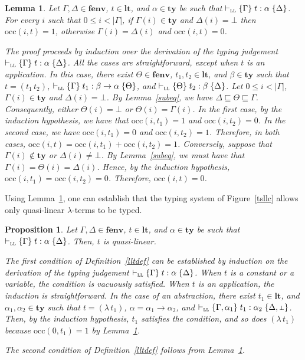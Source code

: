 \documentclass[submission,creativecommons]{eptcs}
\newtheorem{lemma}{Lemma}
\newtheorem{proposition}{Proposition}
\newcommand{\mybox}{\raisebox{3.5pt}{\framebox[7pt]{\rule{0mm}{0.3pt}}}}
\def\qed{\ifmmode\mybox\else{\unskip\nobreak\hfil
\penalty50\hskip1em\null\nobreak\hfil\mybox
\parfillskip=0pt\finalhyphendemerits=0\endgraf}\fi}
\newenvironment{proof}{%

\vspace{.7ex}
\noindent{\it Proof.} \rm}{\qed}
\newcommand{\bt}{{\scriptstyle\bot}}
\newcommand{\iabs}[1]{(\lambda\,#1)}
\newcommand{\iapp}[2]{(#1\,#2)}
\newcommand{\tytm}[4]{\{#1\}\;#2:#3\;\{#4\}}
\newcommand{\der}[1]{\vdash_{#1}}
\newcommand{\Sll}{{\textsc{ll}}}
\newcommand{\ltm}{\mathord{\mathbf{lt}}}
\newcommand{\ty}{\mathord{\mathbf{ty}}}
\newcommand{\fenv}{\mathord{\mathbf{fenv}}}
\newcommand{\occ}[2]{\mathord{\mathrm{occ}}(#1,#2)}
\begin{document}
\begin{lemma}\label{quasi-linearity-aux}
Let $\Gamma, \Delta\in\fenv$, $t\in\ltm$, and $\alpha\in\ty$ be such that
$\der{\Sll}\tytm{\Gamma}{t}{\alpha}{\Delta}$.
For every $i$ such that $0\leq i <|\Gamma|$, if $\Gamma(i)\in\ty$ and $\Delta(i)=\bt$
then $\occ{i}{t} = 1$, otherwise
$\Gamma(i)=\Delta(i)$ and $\occ{i}{t} = 0$.
\begin{proof}
The proof proceeds by induction over the derivation of the typing judgement $\der{\Sll}\tytm{\Gamma}{t}{\alpha}{\Delta}$.
All the cases are straightforward, except when $t$ is an application.
In this case, there exist $\Theta \in\fenv$, $t_1, t_2\in\ltm$, and
$\beta\in\ty$ such that $t=\iapp{t_1}{t_2}$, $\der{\Sll}\tytm{\Gamma}{t_1}{\beta\rightarrow\alpha}{\Theta}$,
and $\der{\Sll}\tytm{\Theta}{t_2}{\beta}{\Delta}$.
Let $0\leq i <|\Gamma|$, $\Gamma(i)\in\ty$ and $\Delta(i)=\bt$.
By Lemma~\ref{subeq}, we have $\Delta\sqsubseteq\Theta\sqsubseteq\Gamma$.
Consequently, either $\Theta(i)=\bt$ or $\Theta(i)=\Gamma(i)$.
In the first case, by the induction hypothesis, we have that $\occ{i}{t_1} = 1$ and $\occ{i}{t_2} =0$. 
In the second case, we have $\occ{i}{t_1} = 0$ and $\occ{i}{t_2} =1$.
Therefore, in both cases, $\occ{i}{t} = \occ{i}{t_1} + \occ{i}{t_2} = 1$.
Conversely, suppose that $\Gamma(i)\not\in\ty$ or $\Delta(i)\not=\bt$.
By Lemma~\ref{subeq}, we must have that $\Gamma(i)=\Theta(i)=\Delta(i)$.
Hence, by the induction hypothesis, $\occ{i}{t_1} = \occ{i}{t_2} =0$. Therefore, $\occ{i}{t} = 0$.
\end{proof}
\end{lemma}

Using Lemma~\ref{quasi-linearity-aux}, one can establish that the typing system of Figure~\ref{tsllc} allows only
quasi-linear $\lambda$-terms to be typed.

\begin{proposition}\label{quasi-linearity}
Let $\Gamma, \Delta\in\fenv$, $t\in\ltm$, and $\alpha\in\ty$ be such that
$\der{\Sll}\tytm{\Gamma}{t}{\alpha}{\Delta}$. Then, $t$ is quasi-linear.
\begin{proof}
The first condition of Definition~\ref{lltdef} can be established by induction on the derivation of the typing judgement
$\der{\Sll}\tytm{\Gamma}{t}{\alpha}{\Delta}$. When $t$ is a constant or a variable, the condition is vacuously satisfied.
When $t$ is an application, the induction is straightforward. In the case of an abstraction,
there exist $t_1\in\ltm$, and $\alpha_1, \alpha_2\in\ty$ such that
$t=\iabs{t_1}$, $\alpha=\alpha_1\rightarrow\alpha_2$, and $\der{\Sll}\tytm{\Gamma, \alpha_1}{t_1}{\alpha_2}{\Delta, \bt}$.
Then, by the induction hypothesis, $t_1$ satisfies the condition, and so does $\iabs{t_1}$ because $\occ{0}{t_1} = 1$
by Lemma~\ref{quasi-linearity-aux}.

The second condition of Definition~\ref{lltdef} follows from Lemma~\ref{quasi-linearity-aux}.
\end{proof}
\end{proposition}
\end{document}
